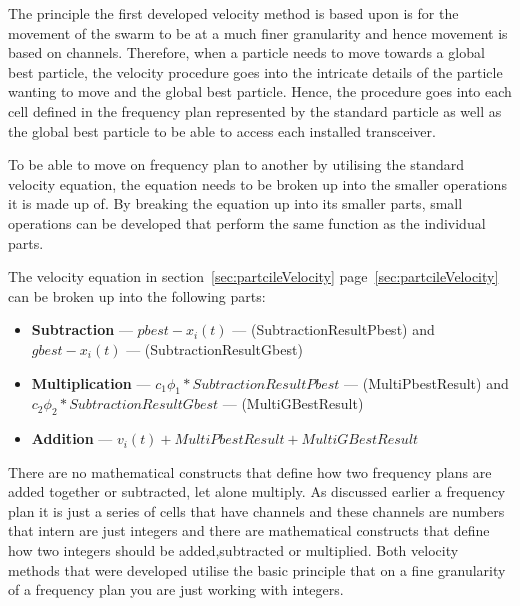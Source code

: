 The principle the first developed velocity method is based upon is for the movement of the swarm to be at a much finer granularity and hence movement is based on channels. Therefore, when a particle needs to move towards a global best particle, the velocity procedure goes into the intricate details of the particle wanting to move and the global best particle. Hence, the procedure goes into each cell defined in the frequency plan represented by the standard particle as well as the global best particle to be able to access each installed transceiver.

To be able to move on frequency plan to another by utilising the standard velocity equation, the equation needs to be broken up into the smaller operations it is made up of. By breaking the equation up into its smaller parts, small operations can be developed that perform the same function as the individual parts. 

The velocity equation in section~\ref{sec:partcileVelocity} page~\ref{sec:partcileVelocity} can be broken up into the following parts:
\label{lst:velocitybreakup}
\begin{itemize}
\item \textbf{Subtraction} --- $pbest - x_i(t)$ --- (SubtractionResultPbest) and $gbest - x_i(t)$ --- (SubtractionResultGbest)
\item \textbf{Multiplication} --- $c_1\phi_1 * SubtractionResultPbest$ --- (MultiPbestResult) and $c_2\phi_2 * SubtractionResultGbest$ --- (MultiGBestResult)
\item \textbf{Addition} --- $v_i(t) + MultiPbestResult + MultiGBestResult$
\end{itemize}
There are no mathematical constructs that define how two frequency plans are added together or subtracted, let alone multiply. As discussed earlier a frequency plan it is just a series of cells that have channels and these channels are numbers that intern are just integers and there are mathematical constructs that define how two integers should be added,subtracted or multiplied. Both velocity methods that were developed utilise the basic principle that on a fine granularity of a frequency plan you are just working with integers.

